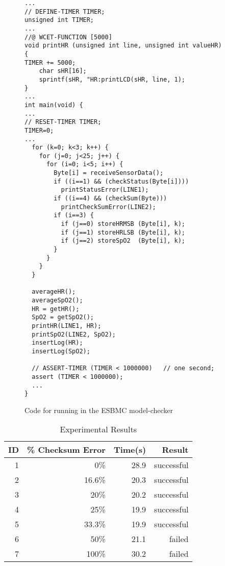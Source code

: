 \documentclass{llncs}
\begin{document}
\linespread{0.7}
\begin{figure}[!htb]
\centering
{\footnotesize
\begin{minipage}{\textwidth}
\begin{verbatim}
...
// DEFINE-TIMER TIMER;
unsigned int TIMER;
...
//@ WCET-FUNCTION [5000]
void printHR (unsigned int line, unsigned int valueHR)
{
TIMER += 5000;
    char sHR[16];
    sprintf(sHR, "HR:printLCD(sHR, line, 1);
}
...
int main(void) {
...
// RESET-TIMER TIMER;
TIMER=0;
...
  for (k=0; k<3; k++) {
    for (j=0; j<25; j++) {
      for (i=0; i<5; i++) {
        Byte[i] = receiveSensorData();
        if ((i==1) && (checkStatus(Byte[i])))
          printStatusError(LINE1);
        if ((i==4) && (checkSum(Byte)))
          printCheckSumError(LINE2);
        if (i==3) {
          if (j==0) storeHRMSB (Byte[i], k);
          if (j==1) storeHRLSB (Byte[i], k);
          if (j==2) storeSpO2  (Byte[i], k);
        }
      }
    }
  }

  averageHR();   
  averageSpO2();
  HR = getHR();
  SpO2 = getSpO2();
  printHR(LINE1, HR);
  printSpO2(LINE2, SpO2);
  insertLog(HR);
  insertLog(SpO2);

  // ASSERT-TIMER (TIMER < 1000000)   // one second;
  assert (TIMER < 1000000);
  ...
}
\end{verbatim} 
\end{minipage}
} 
\caption{Code for running in the ESBMC model-checker}
\label{experiment1} 
\end{figure}


\renewcommand{\baselinestretch}{1.2}
\setlength{\tabcolsep}{4pt}
\begin{table}[!hbt]
\begin{center}
\caption{Experimental Results}
\label{table:results}
\begin{tabular}{| r | r | r | r |}
\hline
    ID & \% Checksum Error & Time(s) & Result  \\
\hline\hline
    1 & 0\% & 28.9 & successful \\ 
\hline
    2 & 16.6\% & 20.3 & successful \\ 
\hline
    3 & 20\% & 20.2 & successful \\ 
\hline
    4 & 25\% & 19.9 & successful \\ 
\hline
    5 & 33.3\% & 19.9 & successful \\ 
\hline
    6 & 50\% & 21.1 & failed \\ 
\hline
    7 & 100\% & 30.2 & failed \\ 
\hline
\end{tabular}
\end{center}
\end{table}
\end{document}
